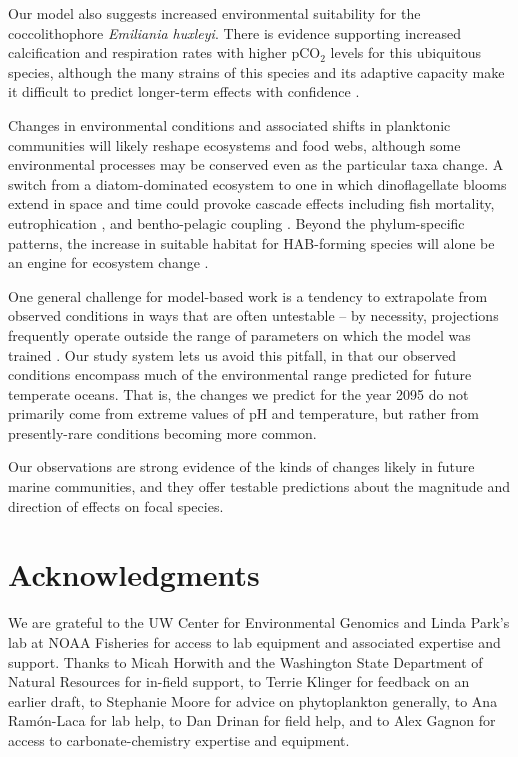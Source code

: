 \documentclass[11pt]{article}
\begin{document}
\begin{linenumbers}
 Our model also suggests increased environmental suitability for the coccolithophore \textit{Emiliania huxleyi}. There is evidence supporting increased calcification and respiration rates with higher pCO$_2$ levels \cite{iglesias2008phytoplankton} for this ubiquitous species, although the many strains of this species and its adaptive capacity make it difficult to predict longer-term effects with confidence \cite{bolton2016decrease}. 
 
 Changes in environmental conditions and associated shifts in planktonic communities will likely reshape ecosystems and food webs, although some environmental processes may be conserved even as the particular taxa change. A switch from a diatom-dominated ecosystem to one in which dinoflagellate blooms extend in space and time could provoke cascade effects \cite{xiao2018warming} including fish mortality, eutrophication \cite{anderson2002harmful}, and bentho-pelagic coupling \citep[][]{bienfang1984sinking}. Beyond the phylum-specific patterns, the increase in suitable habitat for HAB-forming species will alone be an engine for ecosystem change \cite{trainer2019pelagic, wells2018harmful}.
  
One general challenge for model-based work is a tendency to extrapolate from observed conditions in ways that are often untestable -- by necessity, projections frequently operate outside the range of parameters on which the model was trained \cite{fitzpatrick2009projection}. Our study system lets us avoid this pitfall, in that our observed conditions encompass much of the environmental range predicted for future temperate oceans. That is, the changes we predict for the year 2095 do not primarily come from extreme values of pH and temperature, but rather from presently-rare conditions becoming more common. 

Our observations are strong evidence of the kinds of changes likely in future marine communities, and they offer testable predictions about the magnitude and direction of effects on focal species. 







\section{Acknowledgments}

 We are grateful to the UW Center for Environmental Genomics and Linda Park's lab at NOAA Fisheries for access to lab equipment and associated expertise and support. Thanks to Micah Horwith and the Washington State Department of Natural Resources for in-field support, to Terrie Klinger for feedback on an earlier draft, to Stephanie Moore for advice on phytoplankton generally, to Ana Ram\'{o}n-Laca for lab help, to Dan Drinan for field help, and to Alex Gagnon for access to carbonate-chemistry expertise and equipment.



 \end{linenumbers}
\end{document}
